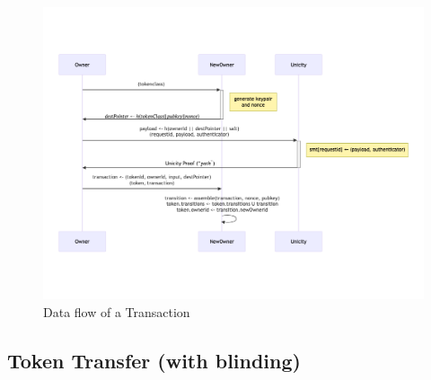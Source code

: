 \begin{figure}[!htbp]
        \begin{center}
        \includegraphics[width=\textwidth]{unicity-tx}
        \caption{Data flow of a Transaction}\label{fig:tx}
        \end{center}
\end{figure}



\subsection{Token Transfer (with blinding)}

